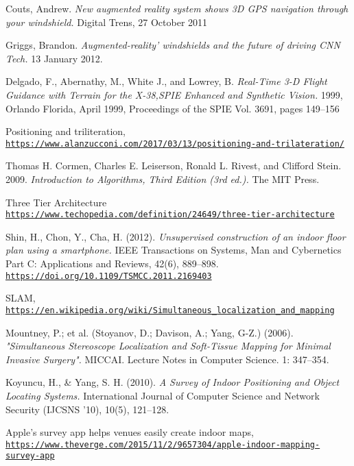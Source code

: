 \begin{thebibliography}{9}
Couts, Andrew. 
\textit{New augmented reality system shows 3D GPS navigation through your windshield.} Digital Trens, 27 October 2011

Griggs, Brandon. \textit{Augmented-reality' windshields and the future of driving CNN Tech.} 13 January 2012.

Delgado, F., Abernathy, M., White J., and Lowrey, B. 
\textit{Real-Time 3-D Flight Guidance with Terrain for the X-38,SPIE Enhanced and Synthetic Vision.} 
1999, Orlando Florida, April 1999, Proceedings of the SPIE Vol. 3691, pages 149–156

Positioning and triliteration,
\\\texttt{\url{https://www.alanzucconi.com/2017/03/13/positioning-and-trilateration/}}

Thomas H. Cormen, Charles E. Leiserson, Ronald L. Rivest, and Clifford Stein. 2009. 
\textit{Introduction to Algorithms, Third Edition (3rd ed.).} 
The MIT Press.

Three Tier Architecture
\\\texttt{\url{https://www.techopedia.com/definition/24649/three-tier-architecture}}

Shin, H., Chon, Y., Cha, H. (2012).
\textit{Unsupervised construction of an indoor floor plan using a smartphone.}
IEEE Transactions on Systems, Man and Cybernetics Part C: Applications and Reviews, 42(6), 889–898. \\\texttt{\url{https://doi.org/10.1109/TSMCC.2011.2169403}}

SLAM,
\\\texttt{\url{https://en.wikipedia.org/wiki/Simultaneous_localization_and_mapping}}

Mountney, P.; et al. (Stoyanov, D.; Davison, A.; Yang, G-Z.) (2006). 
\textit{"Simultaneous Stereoscope Localization and Soft-Tissue Mapping for Minimal Invasive Surgery".}
MICCAI. Lecture Notes in Computer Science. 1: 347–354.

Koyuncu, H., \& Yang, S. H. (2010). 
\textit{A Survey of Indoor Positioning and Object Locating Systems.}
International Journal of Computer Science and Network Security (IJCSNS ’10), 10(5), 121–128.

Apple’s survey app helps venues easily create indoor maps,
\\\texttt{\url{https://www.theverge.com/2015/11/2/9657304/apple-indoor-mapping-survey-app}}


\end{thebibliography}
